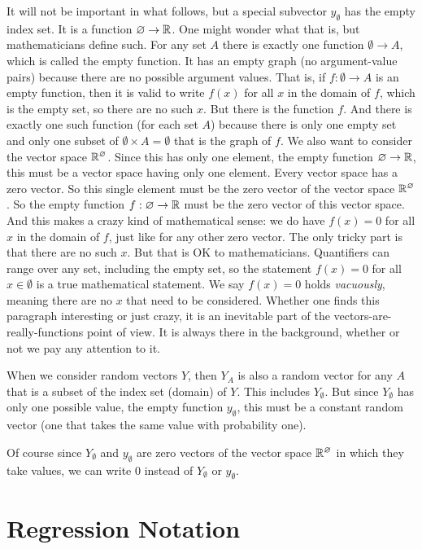 It will not be important in what follows, but a special subvector
$y_\emptyset$ has the empty index set.
It is a function $\varnothing \to \mathbb{R}$.
One might wonder what that is, but mathematicians define such.
For any set $A$ there is exactly one function $\emptyset \to A$,
which is called the empty function.  It has an empty graph
(no argument-value pairs) because there are no possible argument values.
That is, if $f : \emptyset \to A$ is an empty function, then it is
valid to write $f(x)$ for all $x$ in the domain of $f$, which is the
empty set, so there are no such $x$.  But there is the function $f$.
And there is exactly one such function (for each set $A$) because there
is only one empty set and only one subset of
$\emptyset \times A = \emptyset$ that is the graph of $f$.
We also want to consider the vector space $\mathbb{R}^\varnothing$.
Since this has only one element, the empty function $\varnothing \to \mathbb{R}$,
this must be a vector space having only one element.  Every vector space
has a zero vector.  So this single element must be the zero vector of the
vector space $\mathbb{R}^\varnothing$.
So the empty function $f : \varnothing \to \mathbb{R}$ must be the zero vector
of this vector space.  And this makes a crazy kind of mathematical sense:
we do have $f(x) = 0$ for all $x$ in the domain of $f$, just like for
any other zero vector.  The only tricky part is that there are no such $x$.
But that is OK to mathematicians.  Quantifiers can range over any set,
including the empty set, so the statement $f(x) = 0$ for all $x \in \emptyset$
is a true mathematical statement.  We say $f(x) = 0$ holds \emph{vacuously},
meaning there are no $x$ that need to be considered.
Whether one finds this paragraph interesting or just crazy, it is an
inevitable part of the vectors-are-really-functions point of view.
It is always there in the background, whether or not we pay any attention
to it.

When we consider random vectors $Y$, then $Y_A$ is also a random vector
for any $A$ that is a subset of the index set (domain) of $Y$.
This includes $Y_\emptyset$.  But since $Y_\emptyset$ has only one
possible value, the empty function $y_\emptyset$, this must be a constant
random vector (one that takes the same value with probability one).

Of course since $Y_\emptyset$ and $y_\emptyset$ are zero vectors of the
vector space $\mathbb{R}^\varnothing$ in which they take values, we can write
$0$ instead of $Y_\emptyset$ or $y_\emptyset$.

\section{Regression Notation}
\label{sec:regression-notation}


